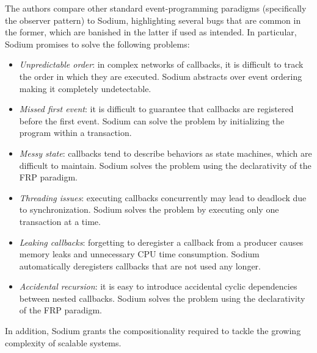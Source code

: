 The authors compare other standard event-programming paradigms (specifically
the observer pattern) to Sodium, highlighting several bugs that are common in
the former, which are banished in the latter if used as intended. In
particular, Sodium promises to solve the following problems:
\begin{itemize}
  \item \textit{Unpredictable order}: in complex networks of callbacks, it is
        difficult to track the order in which they are executed. Sodium
        abstracts over event ordering making it completely undetectable.
  \item \textit{Missed first event}: it is difficult to guarantee that
        callbacks are registered before the first event. Sodium can solve the
        problem by initializing the program within a transaction.
  \item \textit{Messy state}: callbacks tend to describe behaviors as state
        machines, which are difficult to maintain. Sodium solves the problem
        using the declarativity of the \ac{FRP} paradigm.
  \item \textit{Threading issues}: executing callbacks concurrently may lead to
        deadlock due to synchronization. Sodium solves the problem by executing
        only one transaction at a time.
  \item \textit{Leaking callbacks}: forgetting to deregister a callback from
        a producer causes memory leaks and unnecessary CPU time consumption.
        Sodium automatically deregisters callbacks that are not used any longer.
  \item \textit{Accidental recursion}: it is easy to introduce accidental
        cyclic dependencies between nested callbacks. Sodium solves the problem
        using the declarativity of the \ac{FRP} paradigm.
\end{itemize}
In addition, Sodium grants the compositionality required to tackle the growing
complexity of scalable systems.
